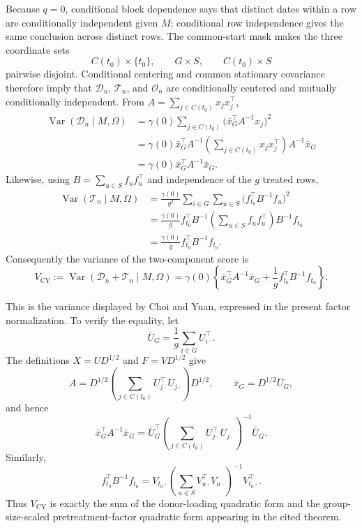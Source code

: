 Because \(q=0\), conditional block dependence says that distinct dates within a row are conditionally independent given \(M\); conditional row independence gives the same conclusion across distinct rows.  The common-start mask makes the three coordinate sets
\[
 C(t_0)\times\{t_0\},
 \qquad G\times S,
 \qquad C(t_0)\times S
\]
pairwise disjoint.  Conditional centering and common stationary covariance therefore imply that \(\mathcal D_n\), \(\mathcal T_n\), and \(\mathcal O_n\) are conditionally centered and mutually conditionally independent.  From \(A=\sum_{j\in C(t_0)}x_jx_j^{\top}\),
\[
 \begin{aligned}
 \operatorname{Var}(\mathcal D_n\mid M,\Omega)
 &=\gamma(0)\sum_{j\in C(t_0)}
    \bigl(\bar x_G^{\top}A^{-1}x_j\bigr)^2\\
 &=\gamma(0)\bar x_G^{\top}A^{-1}
    \left(\sum_{j\in C(t_0)}x_jx_j^{\top}\right)
    A^{-1}\bar x_G\\
 &=\gamma(0)\bar x_G^{\top}A^{-1}\bar x_G.
 \end{aligned}
\]
Likewise, using \(B=\sum_{u\in S}f_uf_u^{\top}\) and independence of the \(g\) treated rows,
\[
 \begin{aligned}
 \operatorname{Var}(\mathcal T_n\mid M,\Omega)
 &=\frac{\gamma(0)}{g^2}\sum_{i\in G}\sum_{u\in S}
   \bigl(f_{t_0}^{\top}B^{-1}f_u\bigr)^2\\
 &=\frac{\gamma(0)}g f_{t_0}^{\top}B^{-1}
   \left(\sum_{u\in S}f_uf_u^{\top}\right)
   B^{-1}f_{t_0}\\
 &=\frac{\gamma(0)}g f_{t_0}^{\top}B^{-1}f_{t_0}.
 \end{aligned}
\]
Consequently the variance of the two-component score is
\[
 V_{\mathrm{CY}}
 :=\operatorname{Var}(\mathcal D_n+\mathcal T_n\mid M,\Omega)
 =\gamma(0)\left\{
    \bar x_G^{\top}A^{-1}\bar x_G
    +\frac1g f_{t_0}^{\top}B^{-1}f_{t_0}
  \right\}.
\]

This is the variance displayed by Choi and Yuan, expressed in the present factor normalization.  To verify the equality, let
\[
 \bar U_G=\frac1g\sum_{i\in G}U_{i\cdot}^{\top}.
\]
The definitions \(X=UD^{1/2}\) and \(F=VD^{1/2}\) give
\[
 A=D^{1/2}\left(\sum_{j\in C(t_0)}
 U_{j\cdot}^{\top}U_{j\cdot}\right)D^{1/2},
 \qquad \bar x_G=D^{1/2}\bar U_G,
\]
and hence
\[
 \bar x_G^{\top}A^{-1}\bar x_G
 =\bar U_G^{\top}
  \left(\sum_{j\in C(t_0)}U_{j\cdot}^{\top}U_{j\cdot}\right)^{-1}
  \bar U_G.
\]
Similarly,
\[
 f_{t_0}^{\top}B^{-1}f_{t_0}
 =V_{t_0\cdot}
  \left(\sum_{u\in S}V_{u\cdot}^{\top}V_{u\cdot}\right)^{-1}
  V_{t_0\cdot}^{\top}.
\]
Thus \(V_{\mathrm{CY}}\) is exactly the sum of the donor-loading quadratic form and the group-size-scaled pretreatment-factor quadratic form appearing in the cited theorem.

